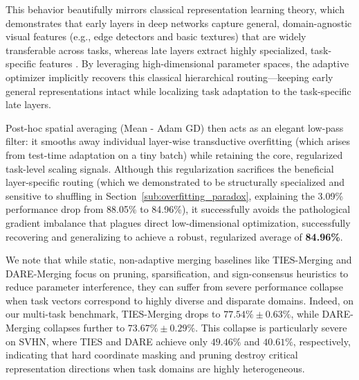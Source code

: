 This behavior beautifully mirrors classical representation learning theory, which demonstrates that early layers in deep networks capture general, domain-agnostic visual features (e.g., edge detectors and basic textures) that are widely transferable across tasks, whereas late layers extract highly specialized, task-specific features \cite{yosinski2014transferable, bengio2013representation}. By leveraging high-dimensional parameter spaces, the adaptive optimizer implicitly recovers this classical hierarchical routing—keeping early general representations intact while localizing task adaptation to the task-specific late layers.

Post-hoc spatial averaging (Mean - Adam GD) then acts as an elegant low-pass filter: it smooths away individual layer-wise transductive overfitting (which arises from test-time adaptation on a tiny batch) while retaining the core, regularized task-level scaling signals. Although this regularization sacrifices the beneficial layer-specific routing (which we demonstrated to be structurally specialized and sensitive to shuffling in Section~\ref{sub:overfitting_paradox}, explaining the 3.09\% performance drop from 88.05\% to 84.96\%), it successfully avoids the pathological gradient imbalance that plagues direct low-dimensional optimization, successfully recovering and generalizing to achieve a robust, regularized average of \textbf{84.96\%}.

We note that while static, non-adaptive merging baselines like TIES-Merging \cite{ties_merging} and DARE-Merging \cite{dare} focus on pruning, sparsification, and sign-consensus heuristics to reduce parameter interference, they can suffer from severe performance collapse when task vectors correspond to highly diverse and disparate domains. Indeed, on our multi-task benchmark, TIES-Merging drops to $77.54\% \pm 0.63\%$, while DARE-Merging collapses further to $73.67\% \pm 0.29\%$. This collapse is particularly severe on SVHN, where TIES and DARE achieve only $49.46\%$ and $40.61\%$, respectively, indicating that hard coordinate masking and pruning destroy critical representation directions when task domains are highly heterogeneous.

